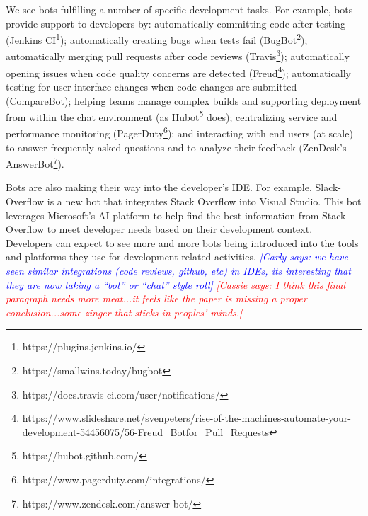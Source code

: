 \documentclass{sig-alternate}
\newcommand{\cl}[1]{\textcolor{blue}{{\it [Carly says: #1]}}}
\newcommand{\cp}[1]{\textcolor{red}{{\it [Cassie says: #1]}}}
\begin{document}
We see bots fulfilling a number of specific development tasks. For example, bots provide support to developers by:
automatically committing code after testing (Jenkins CI\footnote{https://plugins.jenkins.io/}); 
automatically creating bugs when tests fail (BugBot\footnote{https://smallwins.today/bugbot}); 
automatically merging pull requests after code reviews (Travis\footnote{https://docs.travis-ci.com/user/notifications/}); 
automatically opening issues when code quality concerns are detected (Freud\footnote{https://www.slideshare.net/svenpeters/rise-of-the-machines-automate-your-development-54456075/56-Freud\_Botfor\_Pull\_Requests\label{Atlassian}});
automatically testing for user interface changes when code changes are submitted (CompareBot); 
helping teams manage complex builds and supporting deployment from within the chat environment (as Hubot\footnote{https://hubot.github.com/} does); 
centralizing service and performance monitoring (PagerDuty\footnote{https://www.pagerduty.com/integrations/}); and
interacting with end users (at scale) to answer frequently asked questions and to analyze their feedback (ZenDesk's AnswerBot\footnote{https://www.zendesk.com/answer-bot/}).

Bots are also making their way into the developer's IDE. For example, Slack-Overflow is a new bot that integrates Stack Overflow into Visual Studio.  This bot leverages Microsoft's AI platform to help find the best information from Stack Overflow to meet developer needs based on their development context. 
Developers can expect to see more and more bots being introduced into the tools and platforms they use for development related activities.  \cl{we have seen similar integrations (code reviews, github, etc) in IDEs, its interesting that they are now taking a ``bot'' or ``chat'' style roll} \cp{I think this final paragraph needs more meat...it feels like the paper is missing a proper conclusion...some zinger that sticks in peoples' minds.}

\end{document}
